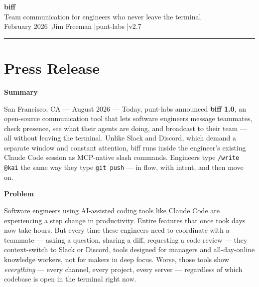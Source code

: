 \documentclass[11pt,letterpaper]{article}
\newcommand{\prsection}[1]{%
  \vspace{1em}%
  {\large\bfseries\color{SectionBlue}#1}%
  \vspace{0.3em}\par%
}
\newcommand{\prfaqversion}[2]{v#1.#2}
\newcommand{\prfaqcurrentversion}{\prfaqversion{2}{7}}
\begin{document}
\begin{center}
  {\LARGE\bfseries\color{SectionBlue} biff} \\[0.5em]
  {\large\color{AccentGray} Team communication for engineers who never leave the terminal} \\[1.5em]
  {\small\color{AccentGray} February 2026 \quad|\quad Jim Freeman \quad|\quad punt-labs \quad|\quad \prfaqcurrentversion}
\end{center}

\vspace{1em}
\noindent\textcolor{QuoteBorder}{\rule{\textwidth}{0.8pt}}
\vspace{1em}


\section*{Press Release}

\prsection{Summary}

San Francisco, CA --- August 2026 --- Today, punt-labs announced
\textbf{biff 1.0}, an open-source communication tool that lets software
engineers message teammates, check presence, see what their agents are doing,
and broadcast to their team --- all without leaving the terminal. Unlike Slack
and Discord, which demand a separate window and constant attention, biff runs
inside the engineer's existing Claude Code session as MCP-native slash
commands. Engineers type \texttt{/write @kai} the same way they type
\texttt{git push} --- in flow, with intent, and then move on.

\prsection{Problem}

Software engineers using AI-assisted coding tools like Claude Code are
experiencing a step change in productivity. Entire features that once took
days now take hours. But every time these engineers need to coordinate with a
teammate --- asking a question, sharing a diff, requesting a code review ---
they context-switch to Slack or Discord, tools designed for managers and
all-day-online knowledge workers, not for makers in deep focus. Worse,
those tools show \emph{everything} --- every channel, every project,
every server --- regardless of which codebase is open in the terminal
right now.
\end{document}
